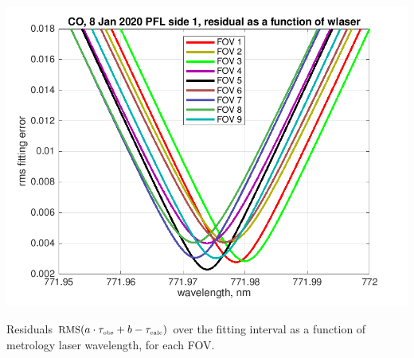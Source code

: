 \documentclass[10pt]{beamer}
\begin{document}
\begin{frame}
\begin{columns}[t]
\begin{column}{0.5\textwidth}
  \begin{centering}
  \includegraphics[width=\textwidth]{figures/CO_wlaser_fit.png}
  \end{centering}\vspace{3mm}

Residuals $\mbox{\small RMS}(a\cdot\tau_{\mbox{\tiny obs}} + b - \tau_{\mbox{\tiny calc}})$ over the fitting
interval as a function of metrology laser wavelength, for each FOV.

\end{column}
\end{columns}
\end{frame}
\end{document}
